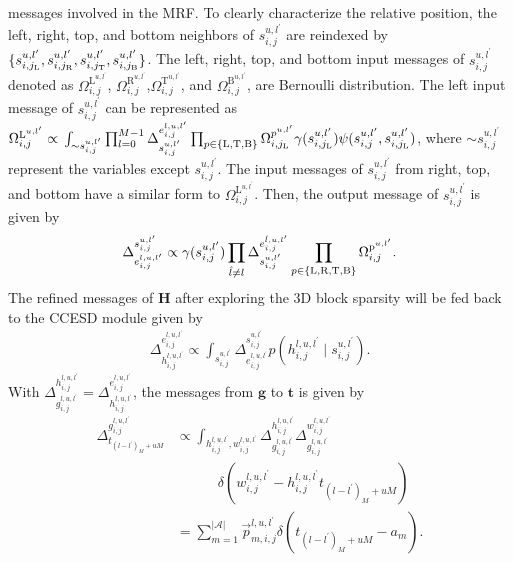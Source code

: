 \documentclass[conference]{IEEEtran}
\begin{document}
    messages involved in the MRF. To clearly characterize
    the relative position, the left, right, top, and bottom neighbors of $s_{i,j}^{u,l^{\prime}}$ are reindexed by $\{s_{i,j_{\text L}}^{u,l^{\prime}}, s_{i,j_{\text R}}^{u,l^{\prime}}, s_{i,j_{\text T}}^{u,l^{\prime}}, s_{i,j_{\text B}}^{u,l^{\prime}} \}$. The left, right, top, and bottom input messages of $s_{i,j}^{u,l^{\prime}}$ denoted as $\Omega^{\text{L}^{u,l^{\prime}}}_{i,j}$, $\Omega^{\text{R}^{u,l^{\prime}}}_{i,j}$,$\Omega^{\text{T}^{u,l^{\prime}}}_{i,j}$, and $\Omega^{\text{B}^{u,l^{\prime}}}_{i,j}$, are Bernoulli distribution. The left input message of $s_{i,j}^{u,l^{\prime}}$ can be represented as	
    	$\Omega^{\text{L}^{u,l^{\prime}}}_{i,j} \propto \nonumber\\
    	\int_{\sim s_{i,j}^{u,l^{\prime}}} \prod_{l=0}^{M-1}
    	\Delta^{e_{i,j}^{l,u,l^{\prime}}}_{s_{i,j}^{u,l^{\prime}}} \prod_{p \in \{\text L,\text T,\text B\}} 
    	\Omega^{p^{u,l^{\prime}}}_{i,j_{\text{L}}} 
    	\gamma(s_{i,j_{\text L}}^{u,l^{\prime}}) 
    	\psi(s_{i,j}^{u,l^{\prime}}, s_{i,j_{\text L}}^{u,l^{\prime}})
    $,
	where $\sim s_{i,j}^{u,l^{\prime}}$ represent the variables except $s_{i,j}^{u,l^{\prime}}$. The input messages of $s_{i,j}^{u,l^{\prime}}$ from right, top, and bottom have a similar form to $\Omega^{\text{L}^{u,l^{\prime}}}_{i,j}$. Then, the output message of $s_{i,j}^{u,l^{\prime}}$ is given by
	\begin{align}
	\label{outputS}
		\Delta^{s_{i,j}^{u,l^{\prime}}}_{e_{i,j}^{l,u,l^{\prime}}} \propto 
		\gamma(s_{i,j}^{u,l^{\prime}})
		\prod_{\hat l \neq l} \Delta_{s_{i,j}^{u,l^{\prime}}}^{e_{i,j}^{\hat l,u,l^{\prime}}}
		\prod_{p \in \{\text L, \text R, \text T, \text B\}}\Omega^{\text{p}^{u,l^{\prime}}}_{i,j}.		
	\end{align}	
	The refined messages of $\mathbf H$ after exploring the 3D block sparsity will be fed back to the CCESD module given by
	\begin{align}
	\label{TSEend}
		\Delta^{e_{i,j}^{l,u,l^{\prime}}}_{h_{i,j}^{l,u,l^{\prime}}}
		\propto \int_{s_{i,j}^{u,l^{\prime}}} \Delta^{s_{i,j}^{u,l^{\prime}}}_{e_{i,j}^{l,u,l^{\prime}}}
			p\left(h_{i, j}^{l, u, l^{\prime}} \mid s_{i, j}^{u, l^{\prime}} \right).
	\end{align}
	With $\Delta^{h_{i,j}^{l,u,l^{\prime}}}_{g_{i,j}^{l,u,l^{\prime}}}=	\Delta^{e_{i,j}^{l,u,l^{\prime}}}_{h_{i,j}^{l,u,l^{\prime}}}$, the messages from $\mathbf g$ to $\mathbf t$ is given by
	\begin{align}
	\label{tstart}
		\Delta^{g_{i,j}^{l,u,l^{\prime}}}_{t_{(l-l^{\prime})_M+uM}}
		&\propto \int_{h_{i,j}^{l,u,l^{\prime}},w_{i,j}^{l,u,l^{\prime}}}   \Delta^{h_{i,j}^{l,u,l^{\prime}}}_{g_{i,j}^{l,u,l^{\prime}}}
		\Delta_{g_{i,j}^{l,u,l^{\prime}}}^{w_{i,j}^{l,u,l^{\prime}}} \nonumber \\ 
		&\quad\quad\quad\delta(w_{i,j}^{l,u,l^{\prime}}-h_{i,j}^{l,u,l^{\prime}}t_{(l-l^{\prime})_M+uM})\nonumber \\
		&=\sum_{m=1}^{|\mathcal{A}|} 
		\overrightarrow{p}^{l,u,l^{\prime}}_{m,i,j} \delta(t_{(l-l^{\prime})_M+uM}-a_m).
	\end{align}
\end{document}
